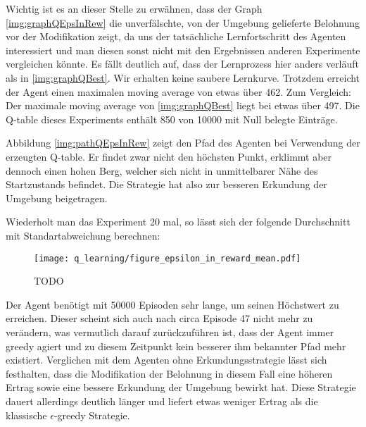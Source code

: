 Wichtig ist es an dieser Stelle zu erwähnen, dass der Graph \ref{img:graphQEpsInRew} die unverfälschte, von der Umgebung gelieferte Belohnung vor der Modifikation zeigt, da uns der tatsächliche Lernfortschritt des Agenten interessiert und man diesen sonst nicht mit den Ergebnissen anderen Experimente vergleichen könnte. Es fällt deutlich auf, dass der Lernprozess hier anders verläuft als in \ref{img:graphQBest}. Wir erhalten keine saubere Lernkurve. Trotzdem erreicht der Agent einen maximalen moving average von etwas über 462. Zum Vergleich: Der maximale moving average von \ref{img:graphQBest} liegt bei etwas über 497. Die Q-table dieses Experiments enthält 850 von 10000 mit Null belegte Einträge.

Abbildung \ref{img:pathQEpsInRew} zeigt den Pfad des Agenten bei Verwendung der erzeugten Q-table. Er findet zwar nicht den höchsten Punkt, erklimmt aber dennoch einen hohen Berg, welcher sich nicht in unmittelbarer Nähe des Startzustands befindet. Die Strategie hat also zur besseren Erkundung der Umgebung beigetragen.

Wiederholt man das Experiment 20 mal, so lässt sich der folgende Durchschnitt mit Standartabweichung berechnen:
\begin{figure}[H]
    \centering
    \texttt{[image: q\_learning/figure\_epsilon\_in\_reward\_mean.pdf]}
    \caption{TODO} \label{img:graphQEpsInRewMean}
\end{figure}
Der Agent benötigt mit 50000 Episoden sehr lange, um seinen Höchstwert zu erreichen. Dieser scheint sich auch nach circa Episode 47 nicht mehr zu verändern, was vermutlich darauf zurückzuführen ist, dass der Agent immer greedy agiert und zu diesem Zeitpunkt kein besserer ihm bekannter Pfad mehr existiert. Verglichen mit dem Agenten ohne Erkundungsstrategie lässt sich festhalten, dass die Modifikation der Belohnung in diesem Fall eine höheren Ertrag sowie eine bessere Erkundung der Umgebung bewirkt hat. Diese Strategie dauert allerdings deutlich länger und liefert etwas weniger Ertrag als die klassische $ \epsilon $-greedy Strategie.




